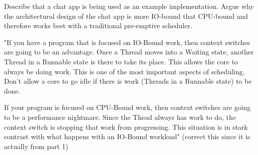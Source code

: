 Describe that a chat app is being used as an example implementation. Argue why the architectural design of the chat app is more IO-bound that CPU-bound \cite{Kennedy2018} and therefore works best with a traditional pre-emptive scheduler.

"If you have a program that is focused on IO-Bound work, then context switches are going to be an advantage. Once a Thread moves into a Waiting state, another Thread in a Runnable state is there to take its place. This allows the core to always be doing work. This is one of the most important aspects of scheduling. Don’t allow a core to go idle if there is work (Threads in a Runnable state) to be done.

If your program is focused on CPU-Bound work, then context switches are going to be a performance nightmare. Since the Thead always has work to do, the context switch is stopping that work from progressing. This situation is in stark contrast with what happens with an IO-Bound workload"\cite{Kennedy2018} (correct this since it is actually from part 1)

